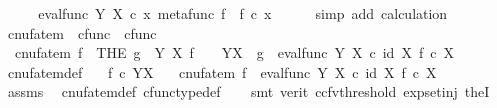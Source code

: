 \begin{isabellebody}
\ \ \isamarkupfalse%
\ \isamarkupfalse%
\ {\isachardoublequoteopen}eval{\isacharunderscore}{\kern0pt}func\ Y\ X\ {\isasymcirc}\isactrlsub c\ {\isasymlangle}x{\isacharcomma}{\kern0pt}\ metafunc\ f{\isasymrangle}\ {\isacharequal}{\kern0pt}\ f\ {\isasymcirc}\isactrlsub c\ x{\isachardoublequoteclose}\isanewline
\ \ \ \ \isamarkupfalse%
\ {\isacharparenleft}{\kern0pt}simp\ add{\isacharcolon}{\kern0pt}\ calculation{\isacharparenright}{\kern0pt}\isanewline
{}\isamarkupfalse%
%
\endisatagproof
{\isafoldproof}%
%
\isadelimproof
%
\endisadelimproof
%
\isadelimdocument
%
\endisadelimdocument
%
\isatagdocument
%
\isamarkuptrue%
%
\endisatagdocument
{\isafolddocument}%
%
\isadelimdocument
%
\endisadelimdocument
{}\isamarkupfalse%
\ cnufatem\ {\isacharcolon}{\kern0pt}{\isacharcolon}{\kern0pt}\ {\isachardoublequoteopen}cfunc\ {\isasymRightarrow}\ cfunc{\isachardoublequoteclose}\ \isanewline
\ \ {\isachardoublequoteopen}cnufatem\ f\ {\isacharequal}{\kern0pt}\ {\isacharparenleft}{\kern0pt}THE\ g{\isachardot}{\kern0pt}\ {\isasymforall}\ Y\ X{\isachardot}{\kern0pt}\ f\ {\isacharcolon}{\kern0pt}\ {\isasymone}\ {\isasymrightarrow}\ Y\isactrlbsup X\isactrlesup \ {\isasymlongrightarrow}\ g\ {\isacharequal}{\kern0pt}\ eval{\isacharunderscore}{\kern0pt}func\ Y\ X\ {\isasymcirc}\isactrlsub c\ {\isasymlangle}id\ X{\isacharcomma}{\kern0pt}\ f\ {\isasymcirc}\isactrlsub c\ {\isasymbeta}\isactrlbsub X\isactrlesub {\isasymrangle}{\isacharparenright}{\kern0pt}{\isachardoublequoteclose}\isanewline
\isanewline
{}\isamarkupfalse%
\ cnufatem{\isacharunderscore}{\kern0pt}def{}{\isacharcolon}{\kern0pt}\isanewline
\ \ \ {\isachardoublequoteopen}f\ {\isasymin}\isactrlsub c\ Y\isactrlbsup X\isactrlesup {\isachardoublequoteclose}\isanewline
\ \ \ {\isachardoublequoteopen}cnufatem\ f\ {\isacharequal}{\kern0pt}\ eval{\isacharunderscore}{\kern0pt}func\ Y\ X\ {\isasymcirc}\isactrlsub c\ {\isasymlangle}id\ X{\isacharcomma}{\kern0pt}\ f\ {\isasymcirc}\isactrlsub c\ {\isasymbeta}\isactrlbsub X\isactrlesub {\isasymrangle}{\isachardoublequoteclose}\isanewline
%
\isadelimproof
\ \ %
\endisadelimproof
%
\isatagproof
{}\isamarkupfalse%
\ assms\ \isamarkupfalse%
\ cnufatem{\isacharunderscore}{\kern0pt}def\ cfunc{\isacharunderscore}{\kern0pt}type{\isacharunderscore}{\kern0pt}def\isanewline
\ \ \isamarkupfalse%
\ {\isacharparenleft}{\kern0pt}smt\ {\isacharparenleft}{\kern0pt}verit{\isacharcomma}{\kern0pt}\ ccfv{\isacharunderscore}{\kern0pt}threshold{\isacharparenright}{\kern0pt}\ exp{\isacharunderscore}{\kern0pt}set{\isacharunderscore}{\kern0pt}inj\ theI{\isacharprime}{\kern0pt}{\isacharparenright}{\kern0pt}%

\end{isabellebody}
